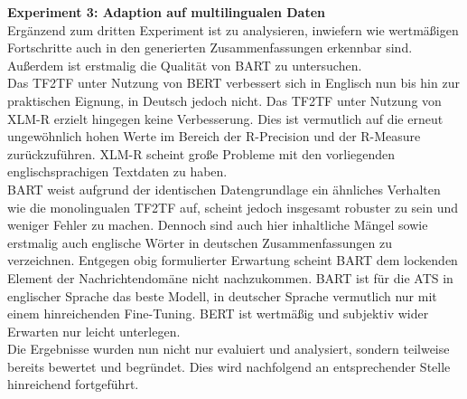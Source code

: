 \noindent
\textbf{Experiment 3: Adaption auf multilingualen Daten}\\
\noindent
Ergänzend zum dritten Experiment ist zu analysieren, inwiefern wie wertmäßigen Fortschritte auch in den generierten Zusammenfassungen erkennbar sind. Außerdem ist erstmalig die Qualität von \ac{BART} zu untersuchen.\\

\noindent
Das \ac{TF2TF} unter Nutzung von \ac{BERT} verbessert sich in Englisch nun bis hin zur praktischen Eignung, in Deutsch jedoch nicht. Das \ac{TF2TF} unter Nutzung von \ac{XLM-R} erzielt hingegen keine Verbesserung. Dies ist vermutlich auf die erneut ungewöhnlich hohen Werte im Bereich der R-Precision und der R-Measure zurückzuführen. \ac{XLM-R} scheint große Probleme mit den vorliegenden englischsprachigen Textdaten zu haben.\\

\noindent
\ac{BART} weist aufgrund der identischen Datengrundlage ein ähnliches Verhalten wie die monolingualen \ac{TF2TF} auf, scheint jedoch insgesamt robuster zu sein und weniger Fehler zu machen. Dennoch sind auch hier inhaltliche Mängel sowie erstmalig auch englische Wörter in deutschen Zusammenfassungen zu verzeichnen. Entgegen obig formulierter Erwartung scheint \ac{BART} dem lockenden Element der Nachrichtendomäne nicht nachzukommen. \ac{BART} ist für die \ac{ATS} in englischer Sprache das beste Modell, in deutscher Sprache vermutlich nur mit einem hinreichenden Fine-Tuning. \ac{BERT} ist wertmäßig und subjektiv wider Erwarten nur leicht unterlegen.\\

\noindent
Die Ergebnisse wurden nun nicht nur evaluiert und analysiert, sondern teilweise bereits bewertet und begründet. Dies wird nachfolgend an entsprechender Stelle hinreichend fortgeführt.
